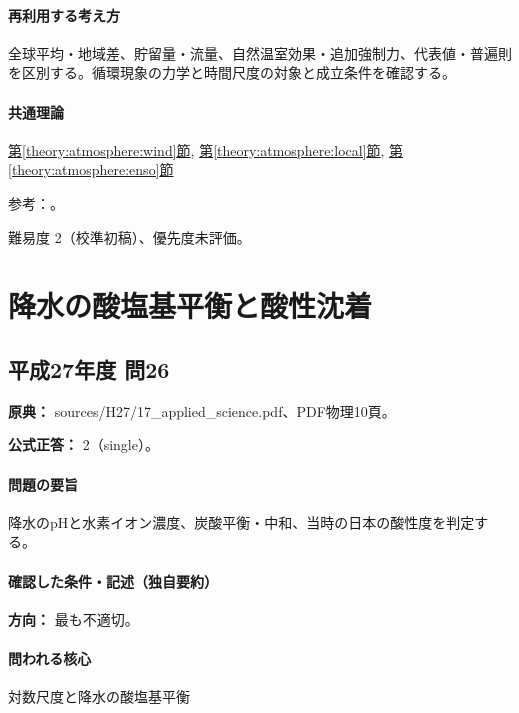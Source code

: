\paragraph{再利用する考え方} 全球平均・地域差、貯留量・流量、自然温室効果・追加強制力、代表値・普遍則を区別する。循環現象の力学と時間尺度の対象と成立条件を確認する。

\paragraph{共通理論} \hyperref[theory:atmosphere:wind]{第\ref*{theory:atmosphere:wind}節}, \hyperref[theory:atmosphere:local]{第\ref*{theory:atmosphere:local}節}, \hyperref[theory:atmosphere:enso]{第\ref*{theory:atmosphere:enso}節}

\par 参考：\cite{atm_jma_enso,atm_noaa_winds,atm_jma_dynamic}。

\par 難易度 2（校準初稿）、優先度未評価。

\section{降水の酸塩基平衡と酸性沈着}

\subsection{平成27年度 問26}
\label{q:h27-reg-applied-26}

\noindent\textbf{原典：} sources/H27/17\_applied\_science.pdf、PDF物理10頁。

\textbf{公式正答：} 2（single）。

\paragraph{問題の要旨} 降水のpHと水素イオン濃度、炭酸平衡・中和、当時の日本の酸性度を判定する。

\paragraph{確認した条件・記述（独自要約）}\mbox{}\par

\noindent\textbf{方向：} 最も不適切。\par

\paragraph{問われる核心} 対数尺度と降水の酸塩基平衡

